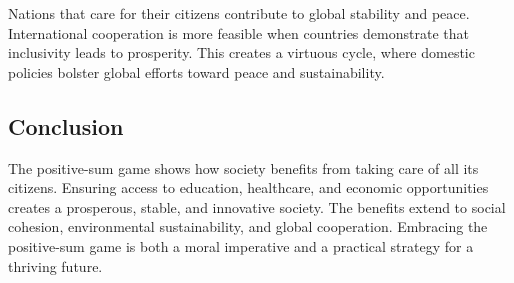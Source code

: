 Nations that care for their citizens contribute to global stability and peace.
International cooperation is more feasible when countries demonstrate that inclusivity leads to prosperity.
This creates a virtuous cycle, where domestic policies bolster global efforts toward peace and sustainability.

\subsection*{Conclusion}
The positive-sum game shows how society benefits from taking care of all its citizens.
Ensuring access to education, healthcare, and economic opportunities creates a prosperous, stable, and innovative society.
The benefits extend to social cohesion, environmental sustainability, and global cooperation.
Embracing the positive-sum game is both a moral imperative and a practical strategy for a thriving future.